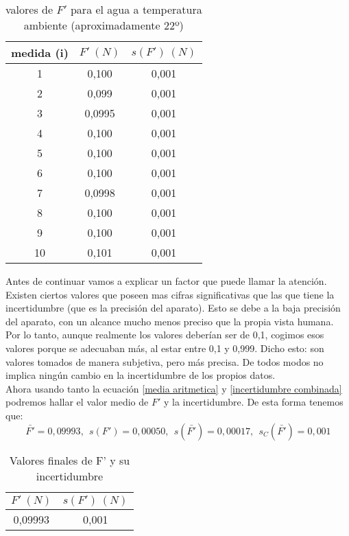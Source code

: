 \documentclass[10pt,a4paper]{article}
\begin{document}
\begin{table}[h]
\begin{center}
\begin{tabular}{|c|c|c|}
\hline
medida (i) & $F' \ (N) $ & $s(F') \ (N) $ 
  \\  \hline
1 & 0,100 & 0,001 
  \\ 
2 & 0,099  & 0,001 
  \\ 
3 & 0,0995  & 0,001 
  \\ 
4 & 0,100 & 0,001  
  \\ 
5 & 0,100 & 0,001  
  \\ 
6 & 0,100 & 0,001 
  \\ 
7 & 0,0998 & 0,001  
  \\ 
8 & 0,100 & 0,001  
  \\ 
9 & 0,100 & 0,001 
  \\ 
10 & 0,101 & 0,001  
  \\ \hline
\end{tabular}
\caption{valores de $F'$ para el agua a temperatura ambiente (aproximadamente 22º)}
\end{center}
\label{tab:F'  }
\end{table}

Antes de continuar vamos a explicar un factor que puede llamar la atención. Existen ciertos valores que poseen mas cifras significativas que las que tiene la incertidumbre (que es la precisión del aparato). Esto se debe a la baja precisión del aparato, con un alcance mucho menos preciso que la propia vista humana. Por lo tanto, aunque realmente los valores deberían ser de 0,1, cogimos esos valores porque se adecuaban más, al estar entre 0,1 y 0,999. Dicho esto: son valores tomados de manera subjetiva, pero más precisa. De todos modos no implica ningún cambio en la incertidumbre de los propios datos. \\

Ahora usando tanto la ecuación \ref{media aritmetica} y \ref{incertidumbre combinada} podremos hallar el valor medio de $F'$ y la incertidumbre. De esta forma tenemos que:
$$ \bar{F'}=0,09993, \ \ s(F')=0,00050, \ \ s(\bar{F'})=0,00017, \ \ s_C(\bar{F'})=0,001 $$

\begin{table}[h!] %
\begin{center}
\begin{tabular}{|c|c|}
\hline
$F' \ (N)$ &  $s(F') \ (N)$ \\ \hline
0,09993 & 0,001 \\ \hline
\end{tabular}
\caption{Valores finales de F' y su incertidumbre}

\label{tab:valores finales F' a temperatura ambiente}
\end{center}
\end{table}
\end{document}
